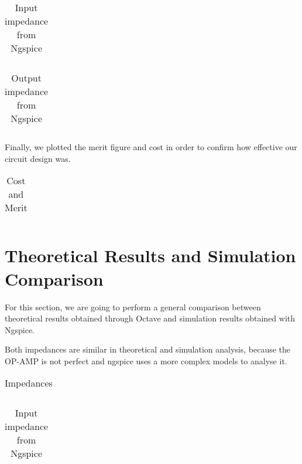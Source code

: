 \begin{table}[H]
\centering
\begin{tabularx}{0.6\textwidth} {
  | >{\raggedright\arraybackslash}X
  | >{\raggedleft\arraybackslash}X | }
 \hline

\end{tabularx}
\caption{Input impedance from Ngspice}
\label{tab7}
\end{table}

\begin{table}[H]
\centering
\begin{tabularx}{0.6\textwidth} {
  | >{\raggedright\arraybackslash}X
  | >{\raggedleft\arraybackslash}X | }
 \hline

\end{tabularx}
\caption{Output impedance from Ngspice}
\label{tab8}
\end{table}



Finally, we plotted the merit figure and cost in order to confirm how effective our circuit design was.


\begin{table}[H]
\centering
\begin{tabularx}{0.6\textwidth} {
  | >{\raggedright\arraybackslash}X
  | >{\raggedleft\arraybackslash}X | }
 \hline

\end{tabularx}
\caption{Cost and Merit}
\end{table}
\section{Theoretical Results and Simulation Comparison}



For this section, we are going to perform a general comparison between theoretical results obtained through Octave and simulation results obtained with Ngspice.

Both impedances are similar in theoretical and simulation
analysis, because the OP-AMP is not perfect and ngspice uses a more complex models to analyse it.

\begin{table}[H]
\centering
\begin{tabularx}{0.6\textwidth} {
  | >{\raggedright\arraybackslash}X
  | >{\raggedleft\arraybackslash}X | }
 \hline

\end{tabularx}
\caption{Impedances}
\end{table}

\begin{table}[H]
\centering
\begin{tabularx}{0.6\textwidth} {
  | >{\raggedright\arraybackslash}X
  | >{\raggedleft\arraybackslash}X | }
 \hline

\end{tabularx}
\caption{Input impedance from Ngspice}
\label{tab17}
\end{table}

